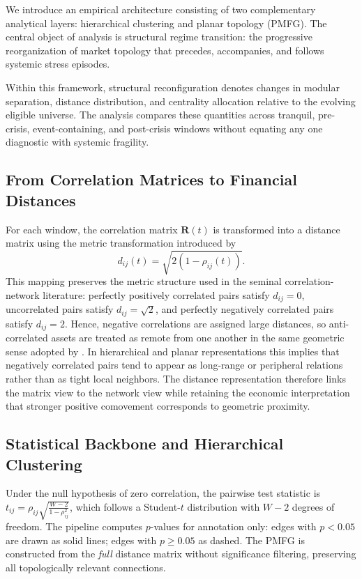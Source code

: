 \documentclass[a4paper,fleqn,review]{cas-sc}
\begin{document}
We introduce an empirical architecture consisting of two complementary analytical layers: hierarchical clustering and planar topology (PMFG). The central object of analysis is structural regime transition: the progressive reorganization of market topology that precedes, accompanies, and follows systemic stress episodes.

Within this framework, structural reconfiguration denotes changes in modular separation, distance distribution, and centrality allocation relative to the evolving eligible universe. The analysis compares these quantities across tranquil, pre-crisis, event-containing, and post-crisis windows without equating any one diagnostic with systemic fragility.

\subsection{From Correlation Matrices to Financial Distances}

For each window, the correlation matrix $\mathbf{R}(t)$ is transformed into a distance matrix using the metric transformation introduced by \citet{mantegna1999hierarchical}
\begin{equation}
d_{ij}(t) = \sqrt{2(1-\rho_{ij}(t))}.
\label{eq:financial-distance}
\end{equation}
This mapping preserves the metric structure used in the seminal correlation-network literature: perfectly positively correlated pairs satisfy $d_{ij}=0$, uncorrelated pairs satisfy $d_{ij}=\sqrt{2}$, and perfectly negatively correlated pairs satisfy $d_{ij}=2$. Hence, negative correlations are assigned large distances, so anti-correlated assets are treated as remote from one another in the same geometric sense adopted by \citet{mantegna1999hierarchical}. In hierarchical and planar representations this implies that negatively correlated pairs tend to appear as long-range or peripheral relations rather than as tight local neighbors. The distance representation therefore links the matrix view to the network view while retaining the economic interpretation that stronger positive comovement corresponds to geometric proximity.

\subsection{Statistical Backbone and Hierarchical Clustering}

Under the null hypothesis of zero correlation, the pairwise test statistic is $t_{ij} = \rho_{ij}\sqrt{\frac{W-2}{1-\rho_{ij}^2}}$, which follows a Student-$t$ distribution with $W-2$ degrees of freedom. The pipeline computes $p$-values for annotation only: edges with $p < 0.05$ are drawn as solid lines; edges with $p \geq 0.05$ as dashed. The PMFG is constructed from the \emph{full} distance matrix without significance filtering, preserving all topologically relevant connections.
\end{document}
